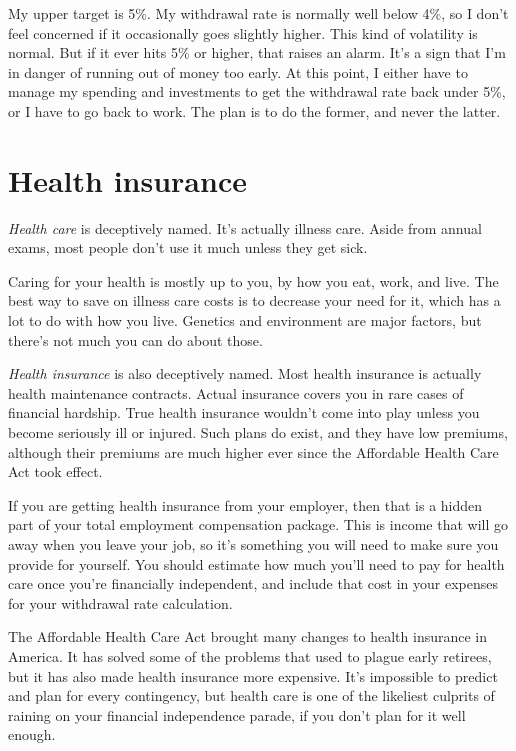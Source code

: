 My upper target is 5\%. My withdrawal rate is normally well below 4\%, so I don't feel concerned if it occasionally goes slightly higher. This kind of volatility is normal. But if it ever hits 5\% or higher, that raises an alarm. It's a sign that I'm in danger of running out of money too early. At this point, I either have to manage my spending and investments to get the withdrawal rate back under 5\%, or I have to go back to work. The plan is to do the former, and never the latter.

\section{Health insurance}
\emph{Health care} is deceptively named. It's actually illness care. Aside from annual exams, most people don't use it much unless they get sick.

Caring for your health is mostly up to you, by how you eat, work, and live. The best way to save on illness care costs is to decrease your need for it, which has a lot to do with how you live. Genetics and environment are major factors, but there's not much you can do about those.

\emph{Health insurance} is also deceptively named. Most health insurance is actually health maintenance contracts. Actual insurance covers you in rare cases of financial hardship. True health insurance wouldn't come into play unless you become seriously ill or injured. Such plans do exist, and they have low premiums, although their premiums are much higher ever since the Affordable Health Care Act took effect.

If you are getting health insurance from your employer, then that is a hidden part of your total employment compensation package. This is income that will go away when you leave your job, so it's something you will need to make sure you provide for yourself. You should estimate how much you'll need to pay for health care once you're financially independent, and include that cost in your expenses for your withdrawal rate calculation.

The Affordable Health Care Act brought many changes to health insurance in America. It has solved some of the problems that used to plague early retirees, but it has also made health insurance more expensive. It's impossible to predict and plan for every contingency, but health care is one of the likeliest culprits of raining on your financial independence parade, if you don't plan for it well enough.

